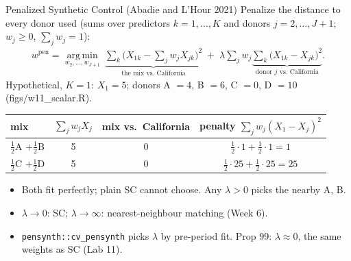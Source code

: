 \documentclass[aspectratio=169,11pt,xcolor=dvipsnames]{beamer}
\newcommand{\srcp}[1]{{\scriptsize\color{gray}(#1)}}
\DeclareMathOperator*{\argminop}{arg\,min}
\newcommand{\argmin}{\argminop\limits}
\begin{document}
\begin{frame}{Penalized Synthetic Control \srcp{Abadie and L'Hour 2021}}
Penalize the distance to every donor used (sums over predictors $k = 1,\dots,K$
and donors $j = 2,\dots,J+1$; $w_j \geq 0$, $\sum_j w_j = 1$):
\begin{align*}
  w^{\text{pen}} = \argmin_{w_2,\dots,w_{J+1}}\
  \underbrace{\textstyle\sum_{k}\big(X_{1k} - \sum_{j} w_j X_{jk}\big)^2}_{\text{the mix vs.\ California}}
  \; + \; \lambda \textstyle\sum_{j} w_j
  \underbrace{\textstyle\sum_{k}\big(X_{1k} - X_{jk}\big)^2}_{\text{donor $j$ vs.\ California}} .
\end{align*}
Hypothetical, $K = 1$: $X_1 = 5$; donors A $= 4$, B $= 6$, C $= 0$, D $= 10$
\srcp{figs/w11\_scalar.R}.
\begin{center}\small
\renewcommand{\arraystretch}{1.05}
\begin{tabular}{@{}lccc@{}}
\toprule
mix & $\sum_j w_j X_{j}$ & mix vs.\ California & penalty $\sum_j w_j (X_{1} - X_{j})^2$ \\
\midrule
$\tfrac12$A $+ \tfrac12$B & 5 & 0 & $\tfrac12\cdot 1 + \tfrac12\cdot 1 = 1$ \\
$\tfrac12$C $+ \tfrac12$D & 5 & 0 & $\tfrac12\cdot 25 + \tfrac12\cdot 25 = 25$ \\
\bottomrule
\end{tabular}
\end{center}
\begin{itemize}\itemsep2pt
  \item Both fit perfectly; plain SC cannot choose. Any $\lambda > 0$ picks the nearby A, B.
  \item $\lambda \to 0$: SC; $\lambda \to \infty$: nearest-neighbour matching (Week 6).
  \item \texttt{pensynth::cv\_pensynth} picks $\lambda$ by pre-period fit. Prop 99:
        $\lambda \approx 0$, the same weights as SC (Lab 11).
\end{itemize}
\end{frame}
\end{document}
